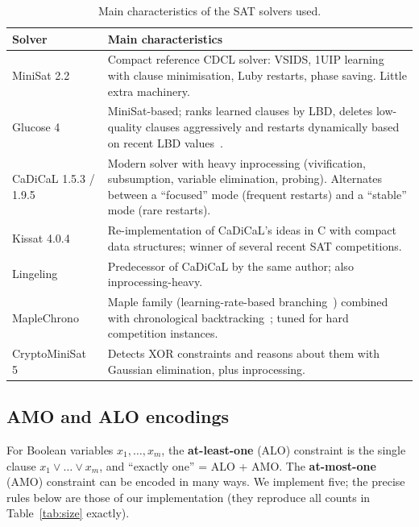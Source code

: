 \begin{table}[pos=htbp]
\caption{Main characteristics of the SAT solvers used.}\label{tab:solverfeat}
\centering\small
\begin{tabular}{lp{11.2cm}}
\toprule
Solver & Main characteristics \\
\midrule
MiniSat 2.2~\cite{een2003} & Compact reference CDCL solver: VSIDS, 1UIP learning with clause minimisation, Luby restarts, phase saving. Little extra machinery. \\
Glucose 4 & MiniSat-based; ranks learned clauses by LBD, deletes low-quality clauses aggressively and restarts dynamically based on recent LBD values~\cite{audemard2009}. \\
CaDiCaL 1.5.3 / 1.9.5~\cite{biere2020} & Modern solver with heavy inprocessing (vivification, subsumption, variable elimination, probing). Alternates between a ``focused'' mode (frequent restarts) and a ``stable'' mode (rare restarts). \\
Kissat 4.0.4~\cite{biere2020} & Re-implementation of CaDiCaL's ideas in C with compact data structures; winner of several recent SAT competitions. \\
Lingeling & Predecessor of CaDiCaL by the same author; also inprocessing-heavy. \\
MapleChrono & Maple family (learning-rate-based branching~\cite{liang2016}) combined with chronological backtracking~\cite{nadel2018}; tuned for hard competition instances. \\
CryptoMiniSat 5~\cite{soos2009} & Detects XOR constraints and reasons about them with Gaussian elimination, plus inprocessing. \\
\bottomrule
\end{tabular}
\end{table}

\subsection{AMO and ALO encodings}\label{sec:amo}
For Boolean variables $x_1,\dots,x_m$, the \textbf{at-least-one} (ALO) constraint is the single clause $x_1\vee\dots\vee x_m$, and ``exactly one'' = ALO + AMO. The \textbf{at-most-one} (AMO) constraint can be encoded in many ways. We implement five; the precise rules below are those of our implementation (they reproduce all counts in Table~\ref{tab:size} exactly).

